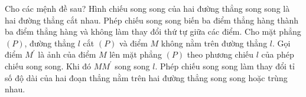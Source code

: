 \begin{ex}
Cho các mệnh đề sau?
\choiceTF
{Hình chiếu song song của hai đường thẳng song song là hai đường thẳng cắt nhau.}
{\True Phép chiếu song song biến ba điểm thẳng hàng thành ba điểm thẳng hàng và không làm thay đổi thứ tự giữa các điểm.}
{\True Cho mặt phẳng $(P)$, đường thẳng $l$ cắt $(P)$ và điểm $M$ không nằm trên đường thẳng $l$. Gọi điểm $M^{\prime}$ là ảnh của điểm $M$ lên mặt phẳng $(P)$ theo phương chiếu $l$ của phép chiếu song song. Khi đó $MM^{\prime}$ song song $l$.}
{Phép chiếu song song làm thay đổi tỉ số độ dài của hai đoạn thẳng nằm trên hai đường thẳng song song hoặc trùng nhau.}
\end{ex}

